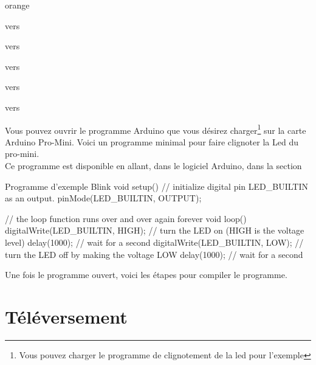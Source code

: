   \begin{items}{orange}{\Triangle}
    \item {} vers 
    \item {} vers 
    \item {} vers 
    \item {} vers 
    \item {} vers 
  \end{items}


 




  Vous pouvez ouvrir le programme Arduino que vous désirez charger\footnote{Vous pouvez charger le programme de clignotement de la led pour l'exemple} sur la carte Arduino Pro-Mini.
  Voici un programme minimal pour faire clignoter la Led du pro-mini. \\
  Ce programme est disponible en allant, dans le logiciel Arduino, dans la section \\
  
  \begin{Cpp}{Programme d'exemple Blink}
  void setup() {
  // initialize digital pin LED_BUILTIN as an output.
  pinMode(LED_BUILTIN, OUTPUT);
}

// the loop function runs over and over again forever
void loop() {
  digitalWrite(LED_BUILTIN, HIGH);   // turn the LED on (HIGH is the voltage level)
  delay(1000);                       // wait for a second
  digitalWrite(LED_BUILTIN, LOW);    // turn the LED off by making the voltage LOW
  delay(1000);                       // wait for a second
}
  \end{Cpp}
  
Une fois le programme ouvert, voici les étapes pour compiler le programme.

  \section{Téléversement}

